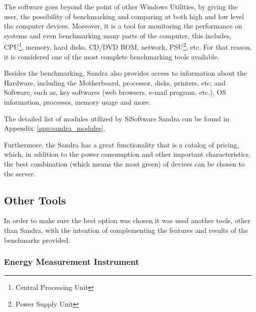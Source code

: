    The software goes beyond the point of other Windows Utilities, by giving the user, the possibility of benchmarking and comparing at both high and low level the computer devices. Moreover, it is a tool for monitoring the performance on systems and even benchmarking many parts of the computer, this includes, CPU\footnote{Central Processing Unit}, memory, hard disks, CD/DVD ROM, network, PSU\footnote{Power Supply Unit}, etc. For that reason, it is considered one of the most complete benchmarking tools available.
    
    Besides the benchmarking, Sandra also provides access to information about the Hardware, including the Motherboard, processor, disks, printers, etc; and Software, such as, key softwares (web browsers, e-mail program, etc.), OS information, processes, memory usage and more.
    
    The detailed list of modules utilized by SiSoftware Sandra can be found in Appendix~\ref{app:sandra_modules}.
    
    Furthermore, the Sandra has a great functionality that is a catalog of pricing, which, in addition to the power consumption and other important characteristics, the best combination (which means the most green) of devices can be chosen to the server.
    
\subsection{Other Tools} \label{sec3:other_tools}
    In order to make sure the best option was chosen it was used another tools, other than Sandra, with the intention of complementing the features and results of the benchmarks provided. 
    
\subsubsection{Energy Measurement Instrument} \label{sec3:measurement_instrument}

